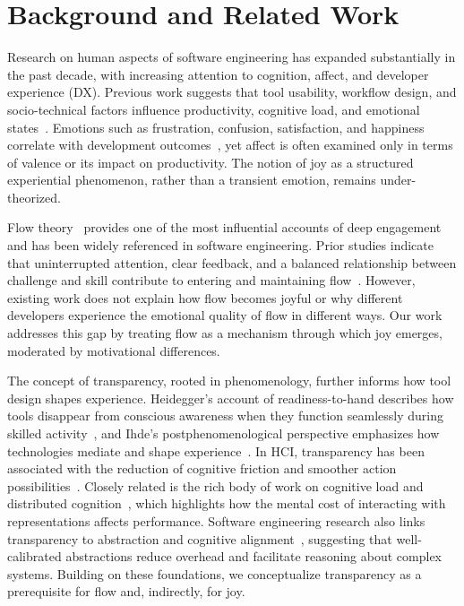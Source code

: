 \documentclass[12pt]{elsarticle}
\begin{document}
\section{Background and Related Work}
\label{sec:background}

Research on human aspects of software engineering has expanded 
substantially in the past decade, with increasing attention to cognition, 
affect, and developer experience (DX). Previous work suggests that tool 
usability, workflow design, and socio-technical factors influence 
productivity, cognitive load, and emotional 
states~\cite{graziotin2017,graziotin2015}. Emotions such as frustration, 
confusion, satisfaction, and happiness correlate with development 
outcomes~\cite{muller2015}, yet affect is often examined only in terms 
of valence or its impact on productivity. The notion of joy as a 
structured experiential phenomenon, rather than a transient emotion, 
remains under-theorized.

Flow theory~\cite{csikszentmihalyi1990} provides one of the most 
influential accounts of deep engagement and has been widely referenced 
in software engineering. Prior studies indicate that uninterrupted 
attention, clear feedback, and a balanced relationship between challenge 
and skill contribute to entering and maintaining flow~\cite{ford2015}. 
However, existing work does not explain how flow becomes joyful or why 
different developers experience the emotional quality of flow in different 
ways. Our work addresses this gap by treating flow as a mechanism through 
which joy emerges, moderated by motivational differences.

The concept of transparency, rooted in phenomenology, further informs 
how tool design shapes experience. Heidegger's account of 
readiness-to-hand describes how tools disappear from conscious awareness 
when they function seamlessly during skilled 
activity~\cite{heidegger1962}, and Ihde's postphenomenological 
perspective emphasizes how technologies mediate and shape 
experience~\cite{ihde1990}. In HCI, transparency has been associated 
with the reduction of cognitive friction and smoother action 
possibilities~\cite{dourish2001}. Closely related is the rich body of 
work on cognitive load and distributed cognition~\cite{hutchins1995,
sweller1988}, which highlights how the mental cost of interacting with 
representations affects performance. Software engineering research also 
links transparency to abstraction and cognitive 
alignment~\cite{kramer2007}, suggesting that well-calibrated abstractions 
reduce overhead and facilitate reasoning about complex systems. Building 
on these foundations, we conceptualize transparency as a prerequisite 
for flow and, indirectly, for joy.
\end{document}
